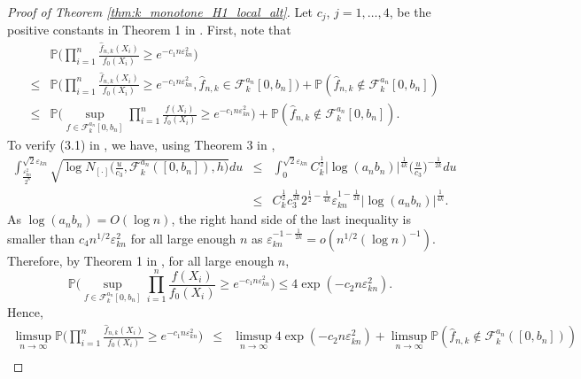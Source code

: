 \documentclass[12pt,letterpaper, twoside, openany]{article}
\theoremstyle{plain}
\begin{document}
\begin{proof}[Proof of Theorem \ref{thm:k_monotone_H1_local_alt}]
Let $c_j$, $j=1,\ldots,4$, be the positive constants in Theorem 1 in \cite{wong1995probability}. First, note that
\begin{eqnarray*}
	&&	\mathbb{P}\bigg( \prod^n_{i=1} \frac{\hat{f}_{n,k}(X_i)}{f_0(X_i)} \geq e^{-c_1 n\varepsilon_{kn}^2} \bigg)\\
	& \leq &
	\mathbb{P}\bigg( \prod^n_{i=1} \frac{\hat{f}_{n,k}(X_i)}{f_0(X_i)} \geq e^{-c_1 n\varepsilon_{kn}^2}, \hat{f}_{n,k} \in \mathcal{F}^{a_n}_k[0,b_n] \bigg) + \mathbb{P}( \hat{f}_{n,k} \notin \mathcal{F}^{a_n}_k[0,b_n] ) \\
	&\leq & \mathbb{P} \bigg( \sup_{f \in \mathcal{F}^{a_n}_k[0, b_n]} \prod^n_{i=1} \frac{f(X_i)}{f_0(X_i)} \geq e^{-c_1n\varepsilon_{kn}^2} \bigg) + \mathbb{P}( \hat{f}_{n,k} \notin \mathcal{F}^{a_n}_k[0,b_n] ). 
\end{eqnarray*}
To verify (3.1) in \cite{wong1995probability}, we have, using Theorem 3 in \cite{gao2009rate},
\begin{eqnarray*}
	\int^{\sqrt{2} \varepsilon_{kn}}_{\frac{\varepsilon_{kn}^2}{2^8} } \sqrt{  \log N_{[\cdot]} \bigg( \frac{u}{c_3}, \mathcal{F}^{a_n}_k([0,b_n]), h \bigg) }du 
	& \leq & \int^{\sqrt{2}\varepsilon_{kn}}_0 C^{\frac{1}{2}}_k | \log (a_n b_n)|^{\frac{1}{4k}} \bigg( \frac{u}{c_3} \bigg)^{-\frac{1}{2k}} du \\
	&\leq & C^{\frac{1}{2}}_k  c_3^{\frac{1}{2k}} 2^{\frac{1}{2} - \frac{1}{4k}} \varepsilon_{kn}^{1-\frac{1}{2k}} | \log (a_n b_n)|^{\frac{1}{4k}}.
\end{eqnarray*}
As $\log(a_n b_n) = O(\log n)$, the right hand side of the last inequality is smaller than $c_4 n^{1/2} \varepsilon_{kn}^2$ for all large enough $n$ as $\varepsilon_{kn}^{-1 - \frac{1}{2k}} = o(n^{1/2}(\log n)^{-1})$. Therefore, by Theorem 1 in \cite{wong1995probability}, for all large enough $n$,  
\begin{equation*}
	\mathbb{P} \bigg( \sup_{f \in \mathcal{F}^{a_n}_k[0, b_n]} \prod^n_{i=1} \frac{f(X_i)}{f_0(X_i)} \geq e^{-c_1n\varepsilon_{kn}^2} \bigg) \leq 4 \exp(-c_2 n \varepsilon_{kn}^2).
\end{equation*}
Hence,
\begin{eqnarray*}
	\limsup_{n \rightarrow \infty}\mathbb{P}\bigg( \prod^n_{i=1} \frac{\hat{f}_{n,k}(X_i)}{f_0(X_i)} \geq  e^{-c_1 n\varepsilon_{kn}^2} \bigg) &\leq& \limsup_{n \rightarrow \infty} 4 \exp(-c_2 n \varepsilon_{kn}^2) + \limsup_{n\rightarrow \infty} \mathbb{P}( \hat{f}_{n,k} \notin \mathcal{F}^{a_n}_k([0,b_n]) ) \\

\end{eqnarray*}
\end{proof}
\end{document}
